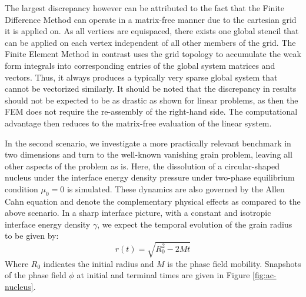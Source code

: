 \documentclass[asi,article,submit,moreauthors]{Definitions/mdpi}
\begin{document}
The largest discrepancy however can be attributed to the fact that the Finite Difference Method can operate in a matrix-free manner due to the cartesian grid it is applied on. As all vertices are equispaced, there exists one global stencil that can be applied on each vertex independent of all other members of the grid. The Finite Element Method in contrast uses the grid topology to accumulate the weak form integrals into corresponding entries of the global system matrices and vectors. Thus, it always produces a typically very sparse global system that cannot be vectorized similarly.
It should be noted that the discrepancy in results should not be expected to be as drastic as shown for linear problems, as then the FEM does not require the re-assembly of the right-hand side.
The computational advantage then reduces to the matrix-free evaluation of the linear system.

In the second scenario, we investigate a more practically relevant benchmark in two dimensions and turn to the well-known vanishing grain problem, leaving all other aspects of the problem as is.
Here, the dissolution of a circular-shaped nucleus under the interface energy density pressure under two-phase equilibrium condition $\mu_0=0$ is simulated. 
These dynamics are also governed by the Allen Cahn equation and denote the complementary physical effects as compared to the above scenario.
In a sharp interface picture, with a constant and isotropic interface energy density $\gamma$, we expect the temporal evolution of the grain radius to be given by:
\begin{equation}
    r(t) = \sqrt{R_0^2 - 2 M t}
\end{equation}
Where $R_0$ indicates the initial radius and $M$ is the phase field mobility.
Snapshots of the phase field $\phi$ at initial and terminal times are given in Figure \ref{fig:ac-nucleus}.
\end{document}
